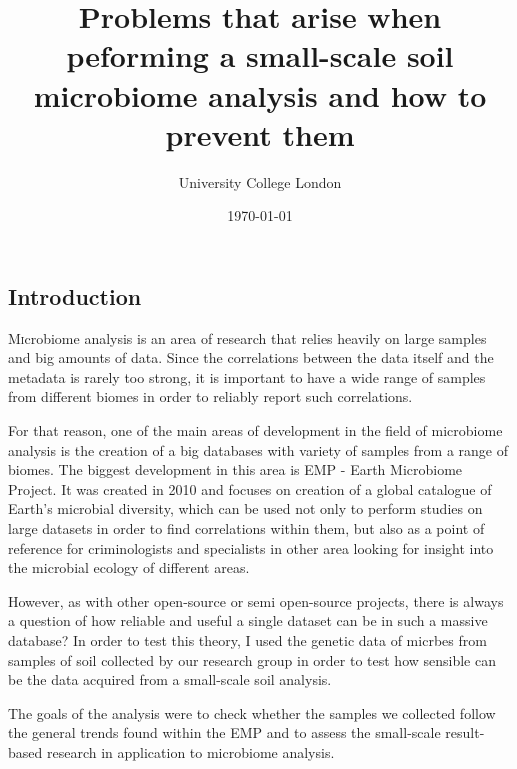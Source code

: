 \documentclass[12pt]{article}
\title{Problems that arise when peforming a small-scale soil microbiome analysis and how to prevent them}
\author{
\normalsize University College London \\
}
\date{\today}
\begin{document}
\maketitle
\begin{multicols}{2}
	
	
\section{Introduction}
\lettrine[nindent=0em,lines=3]{M}icrobiome analysis is an area of research that relies heavily on large samples and big amounts of data. Since the correlations between the data itself and the metadata is rarely too strong, it is important to have a wide range of samples from different biomes in order to reliably report such correlations.
\par
For that reason, one of the main areas of development in the field of microbiome analysis is the creation of a big databases with variety of samples from a range of biomes. The biggest development in this area is  EMP - Earth Microbiome Project\cite{Gilbert2014}. It was created in 2010 and focuses on creation of a global catalogue of Earth's microbial diversity, which can be used not only to perform studies on large datasets in order to find correlations within them, but also as a point of reference for criminologists and specialists in other area looking for insight into the microbial ecology of different areas.
\par
However, as with other open-source or semi open-source projects, there is always a question of how reliable and useful a single dataset can be in such a massive database? In order to test this theory, I used the genetic data of micrbes from samples of soil collected by our research group in order to test how sensible can be the data acquired from a small-scale soil analysis.
\par
The goals of the analysis were to check whether the samples we collected follow the general trends found within the EMP and to assess the small-scale result-based research in application to microbiome analysis.
%
%

\end{multicols}
\end{document}
